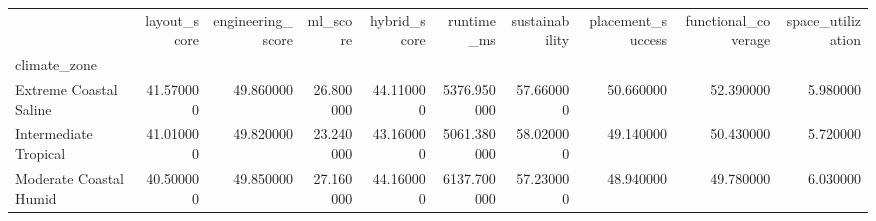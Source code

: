 \begin{tabular}{lrrrrrrrrr}
 & layout_score & engineering_score & ml_score & hybrid_score & runtime_ms & sustainability & placement_success & functional_coverage & space_utilization \\
climate_zone &  &  &  &  &  &  &  &  &  \\
Extreme Coastal Saline & 41.570000 & 49.860000 & 26.800000 & 44.110000 & 5376.950000 & 57.660000 & 50.660000 & 52.390000 & 5.980000 \\
Intermediate Tropical & 41.010000 & 49.820000 & 23.240000 & 43.160000 & 5061.380000 & 58.020000 & 49.140000 & 50.430000 & 5.720000 \\
Moderate Coastal Humid & 40.500000 & 49.850000 & 27.160000 & 44.160000 & 6137.700000 & 57.230000 & 48.940000 & 49.780000 & 6.030000 \\
\end{tabular}
